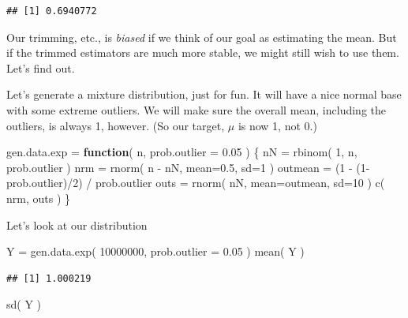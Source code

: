 \documentclass[
]{book}
\newenvironment{Shaded}{\begin{snugshade}}{\end{snugshade}}
\newcommand{\AttributeTok}[1]{\textcolor[rgb]{0.77,0.63,0.00}{#1}}
\newcommand{\ControlFlowTok}[1]{\textcolor[rgb]{0.13,0.29,0.53}{\textbf{#1}}}
\newcommand{\DecValTok}[1]{\textcolor[rgb]{0.00,0.00,0.81}{#1}}
\newcommand{\FloatTok}[1]{\textcolor[rgb]{0.00,0.00,0.81}{#1}}
\newcommand{\FunctionTok}[1]{\textcolor[rgb]{0.00,0.00,0.00}{#1}}
\newcommand{\NormalTok}[1]{#1}
\newcommand{\OtherTok}[1]{\textcolor[rgb]{0.56,0.35,0.01}{#1}}
\newcommand{\SpecialCharTok}[1]{\textcolor[rgb]{0.00,0.00,0.00}{#1}}
\begin{document}
\begin{verbatim}
## [1] 0.6940772
\end{verbatim}

Our trimming, etc., is \emph{biased} if we think of our goal as estimating the
mean. But if the trimmed estimators are much more stable, we might still
wish to use them. Let's find out.

Let's generate a mixture distribution, just for fun. It will have a nice
normal base with some extreme outliers. We will make sure the overall mean,
including the outliers, is always 1, however. (So our target, \(\mu\) is now 1,
not 0.)

\begin{Shaded}
\begin{Highlighting}[]
\NormalTok{gen.data.exp }\OtherTok{=} \ControlFlowTok{function}\NormalTok{( n, }\AttributeTok{prob.outlier =} \FloatTok{0.05}\NormalTok{ ) \{}
\NormalTok{    nN }\OtherTok{=} \FunctionTok{rbinom}\NormalTok{( }\DecValTok{1}\NormalTok{, n, prob.outlier )}
\NormalTok{    nrm }\OtherTok{=} \FunctionTok{rnorm}\NormalTok{( n }\SpecialCharTok{{-}}\NormalTok{ nN, }\AttributeTok{mean=}\FloatTok{0.5}\NormalTok{, }\AttributeTok{sd=}\DecValTok{1}\NormalTok{ )}
\NormalTok{    outmean }\OtherTok{=}\NormalTok{ (}\DecValTok{1} \SpecialCharTok{{-}}\NormalTok{ (}\DecValTok{1}\SpecialCharTok{{-}}\NormalTok{prob.outlier)}\SpecialCharTok{/}\DecValTok{2}\NormalTok{) }\SpecialCharTok{/}\NormalTok{ prob.outlier}
\NormalTok{    outs }\OtherTok{=} \FunctionTok{rnorm}\NormalTok{( nN, }\AttributeTok{mean=}\NormalTok{outmean, }\AttributeTok{sd=}\DecValTok{10}\NormalTok{ )}
    \FunctionTok{c}\NormalTok{( nrm, outs )}
\NormalTok{\}}
\end{Highlighting}
\end{Shaded}

Let's look at our distribution

\begin{Shaded}
\begin{Highlighting}[]
\NormalTok{Y }\OtherTok{=} \FunctionTok{gen.data.exp}\NormalTok{( }\DecValTok{10000000}\NormalTok{, }\AttributeTok{prob.outlier =} \FloatTok{0.05}\NormalTok{ )}
\FunctionTok{mean}\NormalTok{( Y )}
\end{Highlighting}
\end{Shaded}

\begin{verbatim}
## [1] 1.000219
\end{verbatim}

\begin{Shaded}
\begin{Highlighting}[]
\FunctionTok{sd}\NormalTok{( Y )}
\end{Highlighting}
\end{Shaded}
\end{document}
